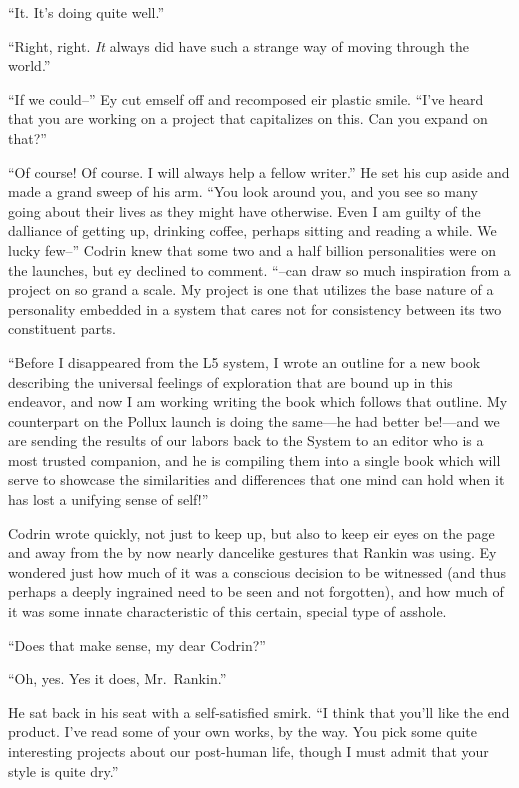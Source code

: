 ``It. It's doing quite well.''

``Right, right. \emph{It} always did have such a strange way of moving through the world.''

``If we could--'' Ey cut emself off and recomposed eir plastic smile. ``I've heard that you are working on a project that capitalizes on this. Can you expand on that?''

``Of course! Of course. I will always help a fellow writer.'' He set his cup aside and made a grand sweep of his arm. ``You look around you, and you see so many going about their lives as they might have otherwise. Even I am guilty of the dalliance of getting up, drinking coffee, perhaps sitting and reading a while. We lucky few--'' Codrin knew that some two and a half billion personalities were on the launches, but ey declined to comment. ``--can draw so much inspiration from a project on so grand a scale. My project is one that utilizes the base nature of a personality embedded in a system that cares not for consistency between its two constituent parts.

``Before I disappeared from the L5 system, I wrote an outline for a new book describing the universal feelings of exploration that are bound up in this endeavor, and now I am working writing the book which follows that outline. My counterpart on the Pollux launch is doing the same---he had better be!---and we are sending the results of our labors back to the System to an editor who is a most trusted companion, and he is compiling them into a single book which will serve to showcase the similarities and differences that one mind can hold when it has lost a unifying sense of self!''

Codrin wrote quickly, not just to keep up, but also to keep eir eyes on the page and away from the by now nearly dancelike gestures that Rankin was using. Ey wondered just how much of it was a conscious decision to be witnessed (and thus perhaps a deeply ingrained need to be seen and not forgotten), and how much of it was some innate characteristic of this certain, special type of asshole.

``Does that make sense, my dear Codrin?''

``Oh, yes. Yes it does, Mr.~Rankin.''

He sat back in his seat with a self-satisfied smirk. ``I think that you'll like the end product. I've read some of your own works, by the way. You pick some quite interesting projects about our post-human life, though I must admit that your style is quite dry.''

